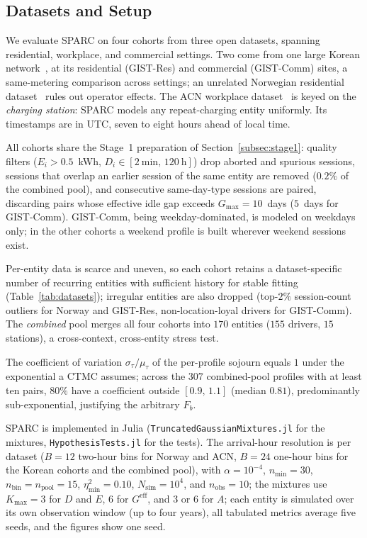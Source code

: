 \documentclass[journal]{IEEEtran}
\begin{document}
\subsection{Datasets and Setup}
\label{subsec:dataset}


We evaluate SPARC on four cohorts from three open datasets, spanning residential, workplace, and commercial settings. Two come from one large Korean network~\cite{baek2024dataset}, at its residential (GIST-Res) and commercial (GIST-Comm) sites, a same-metering comparison across settings; an unrelated Norwegian residential dataset~\cite{sorensen2024} rules out operator effects. The ACN workplace dataset~\cite{lee2019acndata} is keyed on the \emph{charging station}: SPARC models any repeat-charging entity uniformly. Its timestamps are in UTC, seven to eight hours ahead of local time.

All cohorts share the Stage~1 preparation of Section~\ref{subsec:stage1}: quality filters ($E_i > 0.5$~kWh, $D_i \in [2~\text{min},\, 120~\text{h}]$) drop aborted and spurious sessions, sessions that overlap an earlier session of the same entity are removed ($0.2\%$ of the combined pool), and consecutive same-day-type sessions are paired, discarding pairs whose effective idle gap exceeds $G_{\max} = 10$~days ($5$~days for GIST-Comm). GIST-Comm, being weekday-dominated, is modeled on weekdays only; in the other cohorts a weekend profile is built wherever weekend sessions exist.

Per-entity data is scarce and uneven, so each cohort retains a dataset-specific number of recurring entities with sufficient history for stable fitting (Table~\ref{tab:datasets}); irregular entities are also dropped (top-$2\%$ session-count outliers for Norway and GIST-Res, non-location-loyal drivers for GIST-Comm). The \emph{combined} pool merges all four cohorts into $170$ entities ($155$ drivers, $15$ stations), a cross-context, cross-entity stress test.

The coefficient of variation $\sigma_{\tau}/\mu_{\tau}$ of the per-profile sojourn equals $1$ under the exponential a CTMC assumes; across the $307$ combined-pool profiles with at least ten pairs, $80\%$ have a coefficient outside $[0.9,\, 1.1]$ (median $0.81$), predominantly sub-exponential, justifying the arbitrary $F_b$.

SPARC is implemented in Julia (\texttt{TruncatedGaussianMixtures.jl} for the mixtures, \texttt{HypothesisTests.jl} for the tests). The arrival-hour resolution is per dataset ($B = 12$ two-hour bins for Norway and ACN, $B = 24$ one-hour bins for the Korean cohorts and the combined pool), with $\alpha = 10^{-4}$, $n_{\min} = 30$, $n_{\mathrm{bin}} = n_{\mathrm{pool}} = 15$, $\eta^2_{\min} = 0.10$, $N_{\mathrm{sim}} = 10^4$, and $n_{\mathrm{obs}} = 10$; the mixtures use $K_{\max} = 3$ for $D$ and $E$, $6$ for $G^{\mathrm{eff}}$, and $3$ or $6$ for $A$; each entity is simulated over its own observation window (up to four years), all tabulated metrics average five seeds, and the figures show one seed.
\end{document}
